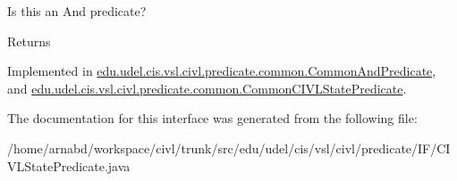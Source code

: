 Is this an And predicate? 

\begin{DoxyReturn}{Returns}

\end{DoxyReturn}


Implemented in \hyperlink{classedu_1_1udel_1_1cis_1_1vsl_1_1civl_1_1predicate_1_1common_1_1CommonAndPredicate_a731ae5101c23f844402609dca417f9f3}{edu.\+udel.\+cis.\+vsl.\+civl.\+predicate.\+common.\+Common\+And\+Predicate}, and \hyperlink{classedu_1_1udel_1_1cis_1_1vsl_1_1civl_1_1predicate_1_1common_1_1CommonCIVLStatePredicate_a7b1a886d6add65c813ab053872204c59}{edu.\+udel.\+cis.\+vsl.\+civl.\+predicate.\+common.\+Common\+C\+I\+V\+L\+State\+Predicate}.



The documentation for this interface was generated from the following file\+:\begin{DoxyCompactItemize}
\item 
/home/arnabd/workspace/civl/trunk/src/edu/udel/cis/vsl/civl/predicate/\+I\+F/C\+I\+V\+L\+State\+Predicate.\+java\end{DoxyCompactItemize}
